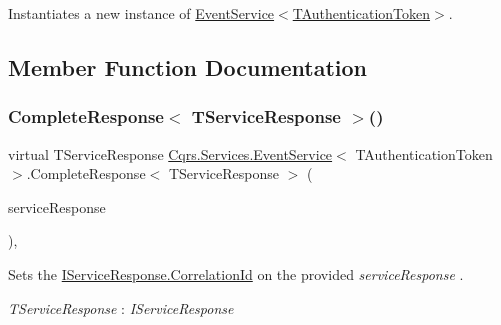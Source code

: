 Instantiates a new instance of \hyperlink{classCqrs_1_1Services_1_1EventService_ac5896c2eb4efbdb42b3cad774b688e45_ac5896c2eb4efbdb42b3cad774b688e45}{Event\+Service$<$\+T\+Authentication\+Token$>$}. 



\subsection{Member Function Documentation}
\mbox{\label{classCqrs_1_1Services_1_1EventService_aef315bb1094123bb9b4ab7bd7be9392b_aef315bb1094123bb9b4ab7bd7be9392b}} 
\subsubsection{\texorpdfstring{Complete\+Response$<$ T\+Service\+Response $>$()}{CompleteResponse< TServiceResponse >()}}
{\footnotesize\ttfamily virtual T\+Service\+Response \hyperlink{classCqrs_1_1Services_1_1EventService}{Cqrs.\+Services.\+Event\+Service}$<$ T\+Authentication\+Token $>$.Complete\+Response$<$ T\+Service\+Response $>$ (\begin{DoxyParamCaption}\item[{T\+Service\+Response}]{service\+Response }\end{DoxyParamCaption})\hspace{0.3cm}{\ttfamily [protected]}, {\ttfamily [virtual]}}



Sets the \hyperlink{interfaceCqrs_1_1Services_1_1IServiceResponse_a5f6a02ee73059558e9859d7e5fe06025_a5f6a02ee73059558e9859d7e5fe06025}{I\+Service\+Response.\+Correlation\+Id} on the provided {\itshape service\+Response} . 

\begin{Desc}
\item[Type Constraints]\begin{description}
\item[{\em T\+Service\+Response} : {\em I\+Service\+Response}]\end{description}
\end{Desc}
\mbox{\label{classCqrs_1_1Services_1_1EventService_a9a68d774ac754e39be56d3e0449f14d7_a9a68d774ac754e39be56d3e0449f14d7}} 
